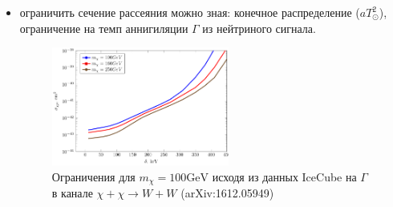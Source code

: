 \begin{itemize}
	\item ограничить сечение рассеяния можно зная: конечное распределение ($aT_{\odot}^2$), ограничение на темп аннигиляции  $\Gamma$ из нейтриного сигнала. 
	\begin{figure}[!h]
		\centering
		\includegraphics[width=0.55\textwidth]{images/Constrains.png}
		\caption{Ограничения для $m_{\chi} = 100 \text{GeV}$ исходя из данных IceCube  на $\Gamma$ в канале $\chi+\chi \to W + W$ (arXiv:1612.05949)} 
	\end{figure}
\end{itemize}
